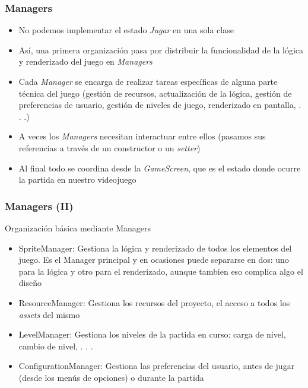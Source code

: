 \documentclass[xcolor={dvipsnames}]{beamer}
\begin{document}
\begin{frame}\frametitle{Managers}
	\begin{itemize}
        \item No podemos implementar el estado \emph{Jugar} en una sola clase
        \item Así, una primera organización pasa por distribuir la funcionalidad de la lógica y renderizado del juego en \emph{Managers}
        \item Cada \emph{Manager} se encarga de realizar tareas específicas de alguna parte técnica del juego (gestión de recursos,
        actualización de la lógica, gestión de preferencias de usuario, gestión de niveles de juego, renderizado en pantalla, . . .)
        \item A veces los \emph{Managers} necesitan interactuar entre ellos (pasamos sus referencias a través de un constructor o un
        \emph{setter})
        \item Al final todo se coordina desde la \emph{GameScreen}, que es el estado donde ocurre la partida en nuestro videojuego
	\end{itemize}
\end{frame}

\begin{frame}\frametitle{Managers (II)}
    \begin{block}{Organización básica mediante Managers}
	\begin{itemize}
        \item \textcolor{resalta}{SpriteManager}: Gestiona la lógica y renderizado de todos los elementos del juego. Es el Manager principal
        y en ocasiones puede separarse en dos: uno para la lógica y otro para el renderizado, aunque tambien eso complica algo el diseño
        \item \textcolor{resalta}{ResourceManager}: Gestiona los recursos del proyecto, el acceso a todos los \emph{assets} del mismo
        \item \textcolor{resalta}{LevelManager}: Gestiona los niveles de la partida en curso: carga de nivel, cambio de nivel, . . .
        \item \textcolor{resalta}{ConfigurationManager}: Gestiona las preferencias del usuario, antes de jugar (desde los menús de opciones)
        o durante la partida
	\end{itemize}
    \end{block}
\end{frame}
\end{document}
